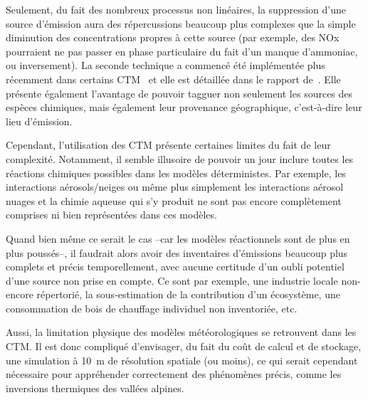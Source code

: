 Seulement, du fait des nombreux processus non linéaires, la suppression d'une source
d'émission aura des répercussions beaucoup plus complexes que la simple diminution des
concentrations propres à cette source (par exemple, des NOx pourraient ne pas passer en
phase particulaire du fait d'un manque d'ammoniac, ou inversement). 
La seconde technique a commencé été implémentée plus récemment dans certains
CTM~\autocite{wangDevelopment2009,wagstromDevelopment2008,kranenburgSource2013,brandtContribution2013}
et elle est détaillée dans le rapport de~\cite{mirceaEuropean2020}. Elle présente également
l'avantage de pouvoir tagguer non seulement les sources des espèces chimiques, mais
également leur provenance géographique, c'est-à-dire leur lieu d'émission.

Cependant, l'utilisation des CTM présente certaines limites du fait de leur complexité.
Notamment, il semble illusoire de pouvoir un jour inclure toutes les réactions chimiques
possibles dans les modèles déterministes. Par exemple, les interactions aérosols/neiges ou
même plus simplement les interactions aérosol nuages et la chimie aqueuse qui s'y produit
ne sont pas encore complètement comprises ni bien représentées dans ces modèles.

Quand bien même ce serait le cas --car les modèles réactionnels sont de plus en plus
poussés--, il faudrait alors avoir des inventaires d'émissions beaucoup plus complets et
précis temporellement, avec aucune certitude d'un oubli potentiel d'une source non prise
en compte. Ce sont par exemple, une industrie locale non-encore répertorié, la sous-estimation de
la contribution d'un écosystème, une consommation de bois de chauffage individuel non
inventoriée, etc.

Aussi, la limitation physique des modèles météorologiques se retrouvent dans les CTM. Il
est donc compliqué d'envisager, du fait du coût de calcul et de stockage, une simulation à
\SI{10}{\m} de résolution spatiale (ou moins), ce qui serait cependant nécessaire pour
appréhender correctement des phénomènes précis, comme les inversions thermiques des
vallées alpines.

